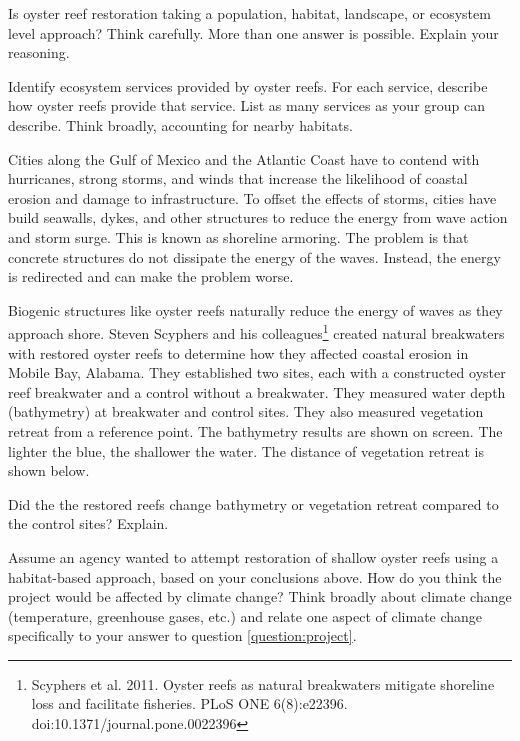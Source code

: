 \documentclass[12pt, addpoints, hidelinks]{exam}
\begin{document}
\begin{questions}

\question[5]
Is oyster reef restoration taking a population, habitat, landscape, or ecosystem level approach? Think carefully. More than one answer is possible. Explain your reasoning.


\question[5]
Identify ecosystem services provided by oyster reefs. For each service, describe how oyster reefs provide that service. List as many services as your group can describe. Think broadly, accounting for nearby habitats.


\newpage

Cities along the Gulf of Mexico and the Atlantic Coast have to contend with hurricanes, strong storms, and winds that increase the likelihood of coastal erosion and damage to infrastructure. To offset the effects of storms, cities have build seawalls, dykes, and other structures to reduce the energy from wave action and storm surge. This is known as shoreline armoring. The problem is that concrete structures do not dissipate the energy of the waves. Instead, the energy is redirected and can make the problem worse. 

Biogenic structures like oyster reefs naturally reduce the energy of waves as they approach shore. Steven Scyphers and his colleagues\footnote{Scyphers et al. 2011. Oyster reefs as natural breakwaters mitigate shoreline loss and facilitate fisheries. PLoS ONE 6(8):e22396. doi:10.1371/journal.pone.0022396} created natural breakwaters with restored oyster reefs to determine how they affected coastal erosion in Mobile Bay, Alabama. They established two sites, each with a constructed oyster reef breakwater and a control without a breakwater.  They measured water depth (bathymetry) at breakwater and control sites. They also measured vegetation retreat from a reference point. The bathymetry results are shown on screen. The lighter the blue, the shallower the water. The distance of vegetation retreat is shown below.

\question[5]
Did the the restored reefs change bathymetry or vegetation retreat compared to the control sites? Explain.

\newpage


\question[5]
Assume an agency wanted to attempt restoration of shallow oyster reefs using a habitat-based approach, based on your conclusions above. How do you think the project would be affected by climate change? Think broadly about climate change (temperature, greenhouse gases, etc.) and relate one aspect of climate change specifically to your answer to question \ref{question:project}.


\end{questions}
\end{document}
